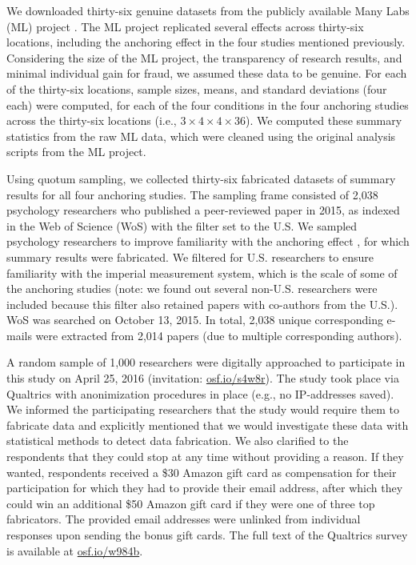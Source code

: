 \documentclass{article}
\begin{document}
We downloaded thirty-six genuine datasets from the publicly available Many Labs (ML) project \citep[\url{osf.io/pqf9r};][]{klein2014}. The ML project replicated several effects across thirty-six locations, including the anchoring effect in the four studies mentioned previously. Considering the size of the ML project, the transparency of research results, and minimal individual gain for fraud, we assumed these data to be genuine. For each of the thirty-six locations, sample sizes, means, and standard deviations (four each) were computed, for each of the four conditions in the four anchoring studies across the thirty-six locations (i.e., $3\times4\times4\times36$). We computed these summary statistics from the raw ML data, which were cleaned using the original analysis scripts from the ML project.

Using quotum sampling, we collected thirty-six fabricated datasets of summary results for all four anchoring studies. The sampling frame consisted of 2,038 psychology researchers who published a peer-reviewed paper in 2015, as indexed in the Web of Science (WoS) with the filter set to the U.S. We sampled psychology researchers to improve familiarity with the anchoring effect \citep{jacowitz1995,tversky1974}, for which summary results were fabricated. We filtered for U.S. researchers to ensure familiarity with the imperial measurement system, which is the scale of some of the anchoring studies (note: we found out several non-U.S. researchers were included because this filter also retained papers with co-authors from the U.S.). WoS was searched on October 13, 2015. In total, 2,038 unique corresponding e-mails were extracted from 2,014 papers (due to multiple corresponding authors).

A random sample of 1,000 researchers were digitally approached to participate in this study on April 25, 2016 (invitation: \url{osf.io/s4w8r}). The study took place via Qualtrics with anonimization procedures in place (e.g., no IP-addresses saved). We informed the participating researchers that the study would require them to fabricate data and explicitly mentioned that we would investigate these data with statistical methods to detect data fabrication. We also clarified to the  respondents that they could stop at any time without providing a reason. If they wanted, respondents received a \$30 Amazon gift card as compensation for their participation for which they had to provide their email address, after which they could win an additional \$50 Amazon gift card if they were one of three top fabricators. The provided email addresses were unlinked from individual responses upon sending the bonus gift cards. The full text of the Qualtrics survey is available at \url{osf.io/w984b}.
\end{document}
